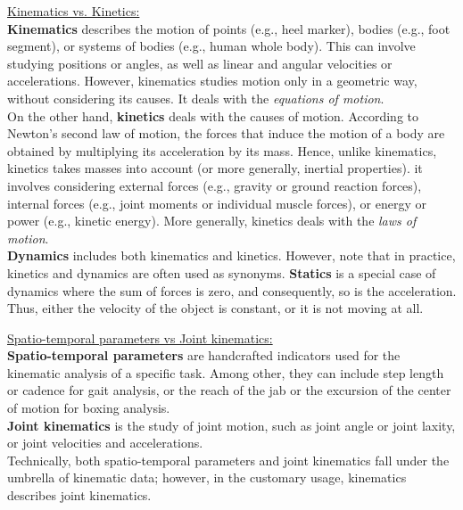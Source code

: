 \noindent\underline{Kinematics vs. Kinetics: }\\
\textbf{Kinematics} describes the motion of points (e.g., heel marker), bodies (e.g., foot segment), or systems of bodies (e.g., human whole body). This can involve studying positions or angles, as well as linear and angular velocities or accelerations. However, kinematics studies motion only in a geometric way, without considering its causes. It deals with the \emph{equations of motion}.\\
On the other hand, \textbf{kinetics} deals with the causes of motion. According to Newton's second law of motion, the forces that induce the motion of a body are obtained by multiplying its acceleration by its mass. Hence, unlike kinematics, kinetics takes masses into account (or more generally, inertial properties). it involves considering external forces (e.g., gravity or ground reaction forces), internal forces (e.g., joint moments or individual muscle forces), or energy or power (e.g., kinetic energy). More generally, kinetics deals with the \emph{laws of motion}.\\
\textbf{Dynamics} includes both kinematics and kinetics. However, note that in practice, kinetics and dynamics are often used as synonyms. \textbf{Statics} is a special case of dynamics where the sum of forces is zero, and consequently, so is the acceleration. Thus, either the velocity of the object is constant, or it is not moving at all. 

\vspace*{0.5cm}

\noindent\underline{Spatio-temporal parameters vs Joint kinematics:}\\
\textbf{Spatio-temporal parameters} are handcrafted indicators used for the kinematic analysis of a specific task. Among other, they can include step length or cadence for gait analysis, or the reach of the jab or the excursion of the center of motion for boxing analysis.\\
\textbf{Joint kinematics} is the study of joint motion, such as joint angle or joint laxity, or joint velocities and accelerations.\\
Technically, both spatio-temporal parameters and joint kinematics fall under the umbrella of kinematic data; however, in the customary usage, kinematics describes joint kinematics.

\vspace*{0.5cm}

